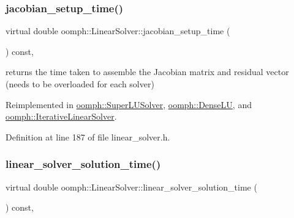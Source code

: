 \mbox{\label{classoomph_1_1LinearSolver_a0fedfb9d9855d0e998c0e32140bc56d4}} 
\subsubsection{\texorpdfstring{jacobian\+\_\+setup\+\_\+time()}{jacobian\_setup\_time()}}
{\footnotesize\ttfamily virtual double oomph\+::\+Linear\+Solver\+::jacobian\+\_\+setup\+\_\+time (\begin{DoxyParamCaption}{ }\end{DoxyParamCaption}) const\hspace{0.3cm}{\ttfamily [inline]}, {\ttfamily [virtual]}}



returns the time taken to assemble the Jacobian matrix and residual vector (needs to be overloaded for each solver) 



Reimplemented in \hyperlink{classoomph_1_1SuperLUSolver_a9e9bdeac1f619319b931d1dea53a2d96}{oomph\+::\+Super\+L\+U\+Solver}, \hyperlink{classoomph_1_1DenseLU_a4605ec2ca02ff0b30f4cefc2458dfb66}{oomph\+::\+Dense\+LU}, and \hyperlink{classoomph_1_1IterativeLinearSolver_aed10c606a26c8084e1fa482f3409f9b3}{oomph\+::\+Iterative\+Linear\+Solver}.



Definition at line 187 of file linear\+\_\+solver.\+h.

\mbox{\label{classoomph_1_1LinearSolver_a3c66f77db812a9c196478c7e2f77ef09}} 
\subsubsection{\texorpdfstring{linear\+\_\+solver\+\_\+solution\+\_\+time()}{linear\_solver\_solution\_time()}}
{\footnotesize\ttfamily virtual double oomph\+::\+Linear\+Solver\+::linear\+\_\+solver\+\_\+solution\+\_\+time (\begin{DoxyParamCaption}{ }\end{DoxyParamCaption}) const\hspace{0.3cm}{\ttfamily [inline]}, {\ttfamily [virtual]}}



